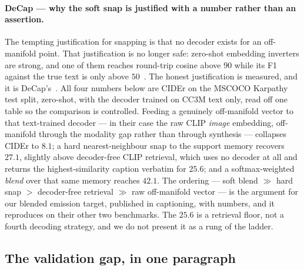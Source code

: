 \documentclass[11pt]{article}
\begin{document}
\paragraph{DeCap --- why the soft snap is justified with a number rather than an assertion.} The
tempting justification for snapping is that no decoder exists for an off-manifold point. That
justification is no longer safe: zero-shot embedding inverters are strong, and one of them reaches
round-trip cosine above $90$ while its F1 against the true text is only above
$50$~\cite{zhang2025zsinvert}. The honest
justification is measured, and it is DeCap's~\cite{li2023decap}. All four numbers below are CIDEr on
the MSCOCO Karpathy test split, zero-shot, with the decoder trained on CC3M text only, read off one
table so the comparison is controlled. Feeding a genuinely off-manifold vector to that text-trained
decoder --- in their case the raw CLIP \emph{image} embedding, off-manifold through the modality gap
rather than through synthesis --- collapses CIDEr to $8.1$; a hard nearest-neighbour snap to the
support memory recovers $27.1$, slightly above decoder-free CLIP retrieval, which uses no decoder at
all and returns the highest-similarity caption verbatim for $25.6$; and a softmax-weighted \emph{blend}
over that same memory reaches $42.1$. The ordering --- soft blend $\gg$ hard snap $>$ decoder-free
retrieval $\gg$ raw off-manifold vector --- is the argument for our blended emission target, published
in captioning, with numbers, and it reproduces on their other two benchmarks. The $25.6$ is a
retrieval floor, not a fourth decoding strategy, and we do not present it as a rung of the ladder.

\subsection{The validation gap, in one paragraph}
\end{document}
